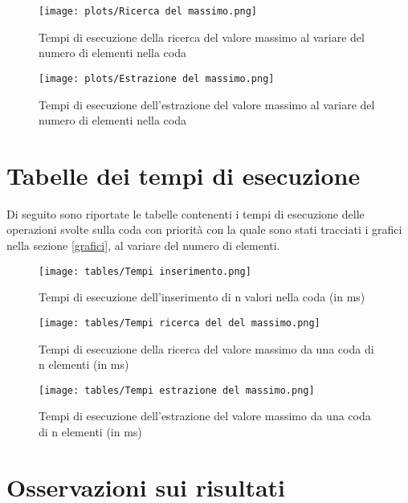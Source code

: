 \documentclass{article}
\begin{document}
\begin{figure}[h]
    \texttt{[image: plots/Ricerca del massimo.png]}
    \centering
    \caption{Tempi di esecuzione della ricerca del valore massimo al variare del numero di elementi nella coda}
    \label{fig:plot_find_max}
\end{figure}

\begin{figure}[h]
    \texttt{[image: plots/Estrazione del massimo.png]}
    \centering
    \caption{Tempi di esecuzione dell'estrazione del valore massimo al variare del numero di elementi nella coda}
    \label{fig:plot_extract_max}
\end{figure}

\clearpage
\section{Tabelle dei tempi di esecuzione}\label{tables}

Di seguito sono riportate le tabelle contenenti i tempi di esecuzione delle operazioni svolte sulla coda con priorità con la quale sono stati tracciati i grafici nella sezione \ref{grafici}, al variare del numero di elementi.

\begin{figure}[h]
    \texttt{[image: tables/Tempi inserimento.png]}
    \centering
    \caption{Tempi di esecuzione dell'inserimento di n valori nella coda (in ms)}
    \label{fig:table_insert}
\end{figure}

\begin{figure}[h]
    \texttt{[image: tables/Tempi ricerca del del massimo.png]}
    \centering
    \caption{Tempi di esecuzione della ricerca del valore massimo da una coda di n elementi (in ms)}
    \label{fig:table_find_max}
\end{figure}

\begin{figure}[h]
    \texttt{[image: tables/Tempi estrazione del massimo.png]}
    \centering
    \caption{Tempi di esecuzione dell'estrazione del valore massimo da una coda di n elementi (in ms)}
    \label{fig:table_extract_max}
\end{figure}

\clearpage
\section{Osservazioni sui risultati}
\end{document}
